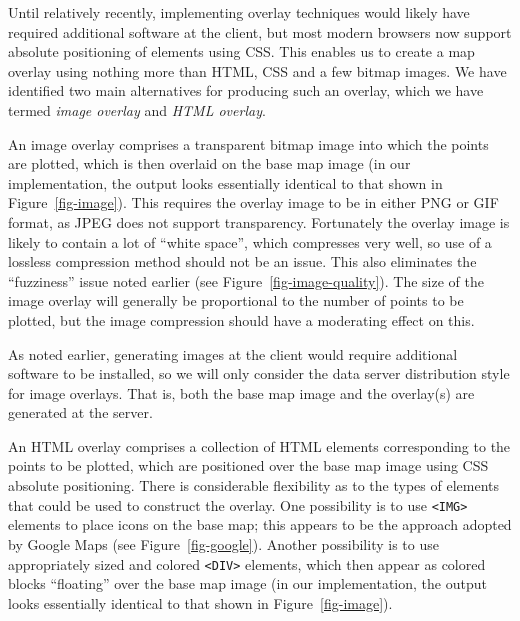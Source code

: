 \documentclass[acmtocl,acmnow]{acmtrans2m}
\begin{document}
Until relatively recently, implementing overlay techniques would likely
have required additional software at the client, but most modern
browsers now support absolute positioning of elements using CSS. This
enables us to create a map overlay using nothing more than HTML, CSS and
a few bitmap images. We have identified two main alternatives for
producing such an overlay, which we have termed \emph{image overlay} and
\emph{HTML overlay}.

An image overlay comprises a transparent bitmap image into which the
points are plotted, which is then overlaid on the base map image (in our
implementation, the output looks essentially identical to that shown in
Figure~\ref{fig-image}). This requires the overlay image to be in either
PNG or GIF format, as JPEG does not support transparency. Fortunately
the overlay image is likely to contain a lot of ``white space'', which
compresses very well, so use of a lossless compression method should not
be an issue. This also eliminates the ``fuzziness'' issue noted earlier
(see Figure~\ref{fig-image-quality}). The size of the image overlay will
generally be proportional to the number of points to be plotted, but the
image compression should have a moderating effect on this.

As noted earlier, generating images at the client would require
additional software to be installed, so we will only consider the data
server distribution style for image overlays. That is, both the base map
image and the overlay(s) are generated at the server.

An HTML overlay comprises a collection of HTML elements corresponding to
the points to be plotted, which are positioned over the base map image
using CSS absolute positioning. There is considerable flexibility as to
the types of elements that could be used to construct the overlay. One
possibility is to use \verb|<IMG>| elements to place icons on the base
map; this appears to be the approach adopted by Google Maps (see
Figure~\ref{fig-google}). Another possibility is to use appropriately
sized and colored \verb|<DIV>| elements, which then appear as colored
blocks ``floating'' over the base map image (in our implementation, the
output looks essentially identical to that shown in
Figure~\ref{fig-image}).
\end{document}
